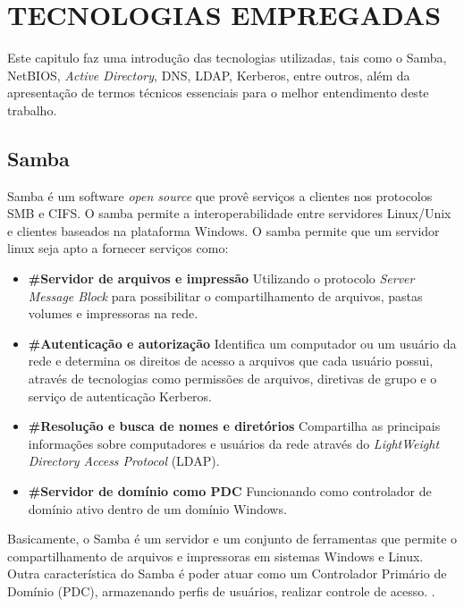 \chapter{TECNOLOGIAS EMPREGADAS}

Este capitulo faz uma introdução das tecnologias utilizadas, tais como o Samba, NetBIOS, \textit{Active Directory}, DNS, LDAP, Kerberos, entre outros, além da apresentação de termos técnicos essenciais para o melhor entendimento deste trabalho.

\section{Samba}

Samba é um software \textit{open source} que provê serviços a clientes nos protocolos SMB e CIFS.
O samba permite a interoperabilidade entre servidores Linux/Unix e clientes baseados na
plataforma Windows.
O samba permite que um servidor linux seja apto a fornecer serviços como:
  \begin{itemize}
    \item \textbf{\#Servidor de arquivos e impressão} Utilizando o protocolo \textit{Server Message Block} para possibilitar o compartilhamento de arquivos, pastas volumes e impressoras na rede.

    \item \textbf{\#Autenticação e autorização} Identifica um computador ou um usuário da rede e determina os direitos de acesso a arquivos que cada usuário possui, através de tecnologias como permissões de arquivos, diretivas de grupo e o serviço de autenticação Kerberos.

    \item \textbf{\#Resolução e busca de nomes e diretórios} Compartilha as principais informações sobre computadores e usuários da rede através do \textit{LightWeight Directory Access Protocol} (LDAP).%

    \item \textbf{\#Servidor de domínio como PDC} Funcionando como controlador de domínio ativo dentro de um domínio Windows.
  \end{itemize}

Basicamente, o Samba é um servidor e um conjunto de ferramentas que permite o compartilhamento de arquivos e impressoras em sistemas Windows e Linux. Outra característica do Samba é poder atuar como um Controlador Primário de Domínio (PDC), armazenando perfis de usuários, realizar controle de acesso. \cite{FOCA}.

